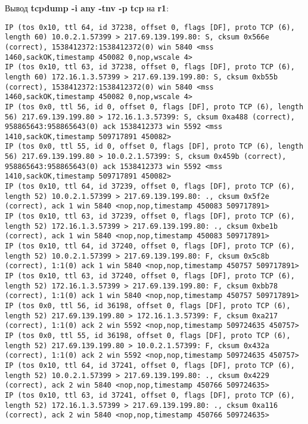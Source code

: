 \documentclass[a4paper,12pt]{article}
\begin{document}
Вывод \textbf{tcpdump -i any -tnv -p tcp} на \textbf{r1}:
\begin{Verbatim}
IP (tos 0x10, ttl 64, id 37238, offset 0, flags [DF], proto TCP (6), length 60) 10.0.2.1.57399 > 217.69.139.199.80: S, cksum 0x566e (correct), 1538412372:1538412372(0) win 5840 <mss 1460,sackOK,timestamp 450082 0,nop,wscale 4>
IP (tos 0x10, ttl 63, id 37238, offset 0, flags [DF], proto TCP (6), length 60) 172.16.1.3.57399 > 217.69.139.199.80: S, cksum 0xb55b (correct), 1538412372:1538412372(0) win 5840 <mss 1460,sackOK,timestamp 450082 0,nop,wscale 4>
IP (tos 0x0, ttl 56, id 0, offset 0, flags [DF], proto TCP (6), length 56) 217.69.139.199.80 > 172.16.1.3.57399: S, cksum 0xa488 (correct), 958865643:958865643(0) ack 1538412373 win 5592 <mss 1410,sackOK,timestamp 509717891 450082>
IP (tos 0x0, ttl 55, id 0, offset 0, flags [DF], proto TCP (6), length 56) 217.69.139.199.80 > 10.0.2.1.57399: S, cksum 0x459b (correct), 958865643:958865643(0) ack 1538412373 win 5592 <mss 1410,sackOK,timestamp 509717891 450082>
IP (tos 0x10, ttl 64, id 37239, offset 0, flags [DF], proto TCP (6), length 52) 10.0.2.1.57399 > 217.69.139.199.80: ., cksum 0x5f2e (correct), ack 1 win 5840 <nop,nop,timestamp 450083 509717891>
IP (tos 0x10, ttl 63, id 37239, offset 0, flags [DF], proto TCP (6), length 52) 172.16.1.3.57399 > 217.69.139.199.80: ., cksum 0xbe1b (correct), ack 1 win 5840 <nop,nop,timestamp 450083 509717891>
IP (tos 0x10, ttl 64, id 37240, offset 0, flags [DF], proto TCP (6), length 52) 10.0.2.1.57399 > 217.69.139.199.80: F, cksum 0x5c8b (correct), 1:1(0) ack 1 win 5840 <nop,nop,timestamp 450757 509717891>
IP (tos 0x10, ttl 63, id 37240, offset 0, flags [DF], proto TCP (6), length 52) 172.16.1.3.57399 > 217.69.139.199.80: F, cksum 0xbb78 (correct), 1:1(0) ack 1 win 5840 <nop,nop,timestamp 450757 509717891>
IP (tos 0x0, ttl 56, id 36198, offset 0, flags [DF], proto TCP (6), length 52) 217.69.139.199.80 > 172.16.1.3.57399: F, cksum 0xa217 (correct), 1:1(0) ack 2 win 5592 <nop,nop,timestamp 509724635 450757>
IP (tos 0x0, ttl 55, id 36198, offset 0, flags [DF], proto TCP (6), length 52) 217.69.139.199.80 > 10.0.2.1.57399: F, cksum 0x432a (correct), 1:1(0) ack 2 win 5592 <nop,nop,timestamp 509724635 450757>
IP (tos 0x10, ttl 64, id 37241, offset 0, flags [DF], proto TCP (6), length 52) 10.0.2.1.57399 > 217.69.139.199.80: ., cksum 0x4229 (correct), ack 2 win 5840 <nop,nop,timestamp 450766 509724635>
IP (tos 0x10, ttl 63, id 37241, offset 0, flags [DF], proto TCP (6), length 52) 172.16.1.3.57399 > 217.69.139.199.80: ., cksum 0xa116 (correct), ack 2 win 5840 <nop,nop,timestamp 450766 509724635>
\end{Verbatim}
\end{document}
